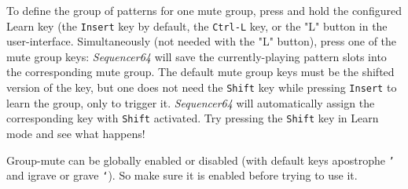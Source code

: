 

   To define the group of patterns for one mute group, press and hold the
   configured Learn key (the \texttt{Insert} key by default,
   the \texttt{Ctrl-L} key, or the "L" button in the user-interface.
   Simultaneously (not needed with the "L" button),
   press one of the mute group keys: \textsl{Sequencer64}
   will save the currently-playing pattern slots into the corresponding mute
   group.
   The default mute group keys must be the shifted version of the key,
   but one does not need the \texttt{Shift} key while pressing
   \texttt{Insert} to learn the group, only to trigger it.
   \textsl{Sequencer64} will automatically assign the corresponding key with
   \texttt{Shift} activated.  Try pressing the \texttt{Shift} key in Learn mode
   and see what happens!


   Group-mute can be globally enabled or disabled (with default keys apostrophe
   \texttt{'}   and igrave or grave \texttt{`}).
   So make sure it is enabled before trying to use it.

%

